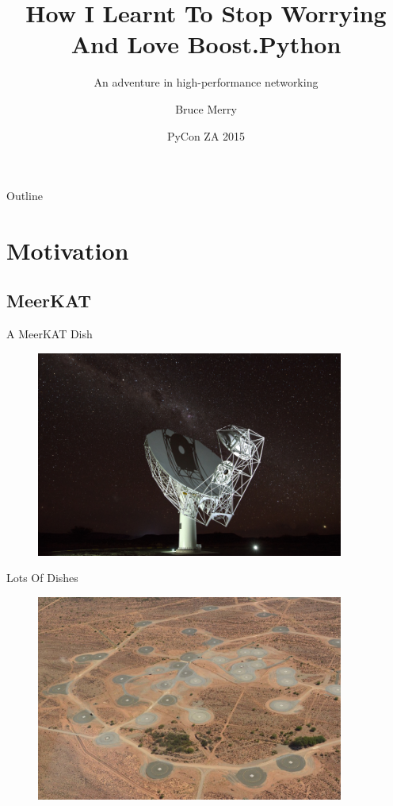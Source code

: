 \documentclass{beamer}
\title[Boost.Python]{How I Learnt To Stop Worrying And Love Boost.Python}
\subtitle{An adventure in high-performance networking}
\author{Bruce Merry}
\institute[SKA SA]{SKA South Africa}
\date{PyCon ZA 2015}
\begin{document}
\begin{frame}
  \titlepage
\end{frame}

\begin{frame}{Outline}
  \tableofcontents
\end{frame}

\section{Motivation}

\subsection{MeerKAT}

\begin{frame}{A MeerKAT Dish}
  \begin{figure}
    \includegraphics[width=0.9\textwidth]{mkat-dish.jpg}
  \end{figure}
\end{frame}

\begin{frame}{Lots Of Dishes}
  \begin{figure}
    \includegraphics[width=0.9\textwidth]{mkat-core.jpg}
  \end{figure}
\end{frame}
\end{document}
